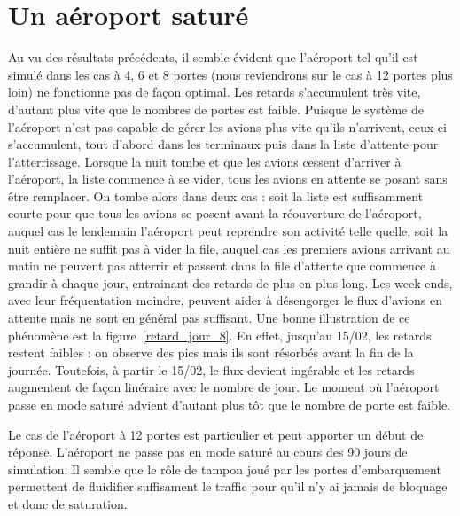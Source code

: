 
\section{Un aéroport saturé}
Au vu des résultats précédents, il semble évident que l'aéroport tel qu'il est simulé dans les cas à 4, 6 et 8 portes (nous reviendrons sur le cas à 12 portes plus loin) ne fonctionne pas de façon optimal.
Les retards s'accumulent très vite, d'autant plus vite que le nombres de portes est faible. Puisque le système de l'aéroport n'est pas capable de gérer les avions plus vite qu'ils n'arrivent, ceux-ci s'accumulent, tout d'abord dans les terminaux puis dans la liste d'attente pour l'atterrissage.
Lorsque la nuit tombe et que les avions cessent d'arriver à l'aéroport, la liste commence à se vider, tous les avions en attente se posant sans être remplacer. On tombe alors dans deux cas : soit la liste est suffisamment courte pour que tous les avions se posent avant la réouverture de l'aéroport, auquel cas le lendemain l'aéroport peut reprendre son activité telle quelle, soit la nuit entière ne suffit pas à vider la file, auquel cas les premiers avions arrivant au matin ne peuvent pas atterrir et passent dans la file d'attente que commence à grandir à chaque jour, entrainant des retards de plus en plus long. Les week-ends, avec leur fréquentation moindre, peuvent aider à désengorger le flux d'avions en attente mais ne sont en général pas suffisant.
Une bonne illustration de ce phénomène est la figure~\ref{retard_jour_8}. En effet, jusqu'au 15/02, les retards restent faibles : on observe des pics mais ils sont résorbés avant la fin de la journée. Toutefois, à partir le 15/02, le flux devient ingérable et les retards augmentent de façon linéraire avec le nombre de jour.
Le moment où l'aéroport passe en mode saturé advient d'autant plus tôt que le nombre de porte est faible.

Le cas de l'aéroport à 12 portes est particulier et peut apporter un début de réponse. L'aéroport ne passe pas en mode saturé au cours des 90 jours de simulation. Il semble que le rôle de tampon joué par les portes d'embarquement permettent de fluidifier suffisament le traffic pour qu'il n'y ai jamais de bloquage et donc de saturation.


